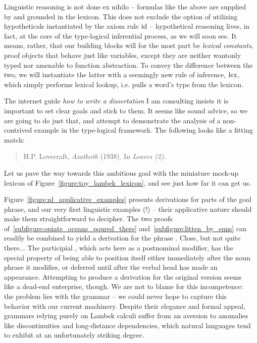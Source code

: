 Linguistic reasoning is not done ex nihilo -- formulas like the above are supplied by and grounded in the lexicon. 
This does not exclude the option of utilizing hypotheticals instantiated by the axiom rule $\mathrm{id}$ -- hypothetical reasoning lives, in fact, at the core of the type-logical inferential process, as we will soon see.
It means, rather, that our building blocks will for the most part be \textit{lexical constants}, proof objects that behave just like variables, except they are neither wantonly typed nor amenable to function abstraction.
To convey the difference between the two, we will instantiate the latter with a seemingly new rule of inference, $\mathrm{lex}$, which simply performs lexical lookup, i.e. pulls a word's type from the lexicon.

The internet guide \textit{how to write a dissertation} I am consulting insists it is important to set clear goals and stick to them.
It seems like sound advice, so we are going to do just that, and attempt to demonstrate the analysis of a non-contrived example in the type-logical framework.
The following looks like a fitting match:
\begin{quotation}
\begin{flushright} H.P. Lovecraft, \textit{Azathoth}  (1938). In \textit{Leaves (2).}\end{flushright}
\end{quotation}
Let us pave the way towards this ambitious goal with the miniature mock-up lexicon of Figure~\ref{figure:toy_lambek_lexicon}, and see just how far it can get us.

Figure~\ref{figure:nl_applicative_examples} presents derivations for parts of the goal phrase, and our very first linguistic examples (!) -- their applicative nature should make them straightforward to decipher.
The two proofs of~\ref{subfigure:opiate_oceans_poured_there} and~\ref{subfigure:litten_by_suns} can readily be combined to yield a derivation for the phrase . 
Close, but not quite there...
The participial , which acts here as a postnominal modifier, has the special property of being able to position itself either immediately after the noun phrase  it modifies, or deferred until after the verbal head  has made an appearance.
Attempting to produce a derivation for the original version seems like a dead-end enterprise, though.
We are not to blame for this incompetence: the problem lies with the grammar -- we could never hope to capture this behavior with our current machinery.
Despite their elegance and formal appeal, grammars relying purely on Lambek calculi suffer from an aversion to anomalies like discontinuities and long-distance dependencies, which natural languages tend to exhibit at an unfortunately striking degree.

